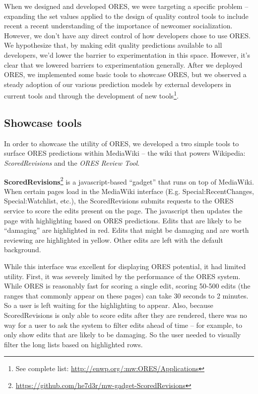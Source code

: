 When we designed and developed ORES, we were targeting a specific problem -- expanding the set values applied to the design of quality control tools to include recent a recent understanding of the importance of newcomer socialization.  However, we don't have any direct control of how developers chose to use ORES.  We hypothesize that, by making edit quality predictions available to all developers, we'd lower the barrier to experimentation in this space.  However, it's clear that we lowered barriers to experimentation generally.  After we deployed ORES, we implemented some basic tools to showcase ORES, but we observed a steady adoption of our various prediction models by external developers in current tools and through the development of new tools\footnote{See complete list: \url{http://enwp.org/:mw:ORES/Applications}}.

\subsection{Showcase tools}
In order to showcase the utility of ORES, we developed a two simple tools to surface ORES predictions within MediaWiki -- the wiki that powers Wikipedia: \emph{ScoredRevisions} and the \emph{ORES Review Tool}.

\textbf{ScoredRevisions}\footnote{\url{https://github.com/he7d3r/mw-gadget-ScoredRevisions}} is a javascript-based ``gadget'' that runs on top of MediaWiki.  When certain pages load in the MediaWiki interface (E.g. Special:RecentChanges, Special:Watchlist, etc.), the ScoredRevisions submits requests to the ORES service to score the edits present on the page.  The javascript then updates the page with highlighting based on ORES predictions.  Edits that are likely to be ``damaging'' are highlighted in red.  Edits that might be damaging and are worth reviewing are highlighted in yellow.  Other edits are left with the default background.

While this interface was excellent for displaying ORES potential, it had limited utility.  First, it was severely limited by the performance of the ORES system.  While ORES is reasonably fast for scoring a single edit, scoring 50-500 edits (the ranges that commonly appear on these pages) can take 30 seconds to 2 minutes.  So a user is left waiting for the highlighting to appear.  Also, because ScoredRevisions is only able to score edits after they are rendered, there was no way for a user to ask the system to filter edits ahead of time -- for example, to only show edits that are likely to be damaging.  So the user needed to visually filter the long lists based on highlighted rows.

